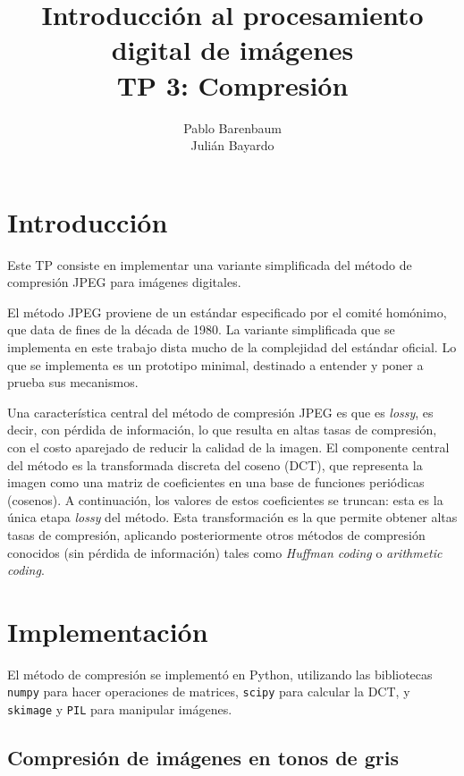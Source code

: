 \documentclass{article}
\title{
  Introducci\'on al procesamiento digital de im\'agenes \\
  {\bf TP 3: Compresi\'on}
}
\author{
  Pablo Barenbaum \\
  Juli\'an Bayardo
}
\date{}
\begin{document}
\maketitle
\tableofcontents

\section{Introducción}

Este TP consiste en implementar una variante simplificada del método
de compresión JPEG para imágenes digitales.

El método JPEG proviene de un estándar especificado por el comité homónimo,
que data de fines de la década de 1980.
La variante simplificada que se implementa en este trabajo
dista mucho de la complejidad del estándar oficial.
Lo que se implementa es un prototipo minimal,
destinado a entender y poner a prueba sus mecanismos.

Una característica central del método de compresión JPEG es que es {\em lossy},
es decir, con pérdida de información,
lo que resulta en altas tasas de compresión,
con el costo aparejado de reducir la calidad de la imagen.
El componente central del método es la
transformada discreta del coseno (DCT), que representa la imagen
como una matriz de coeficientes en una base de funciones periódicas
(cosenos).
A continuación, los valores de estos coeficientes se truncan:
esta es la única etapa {\em lossy} del método.
Esta transformación es la que permite obtener altas tasas de compresión,
aplicando posteriormente otros métodos de compresión conocidos
(sin pérdida de información) tales como {\em Huffman coding}
o {\em arithmetic coding}.

\section{Implementación}

El método de compresión se implementó en Python, utilizando
las bibliotecas
\texttt{numpy} para hacer operaciones de matrices,
\texttt{scipy} para calcular la DCT,
y \texttt{skimage} y \texttt{PIL} para manipular imágenes.

\subsection{Compresión de imágenes en tonos de gris}
\end{document}
